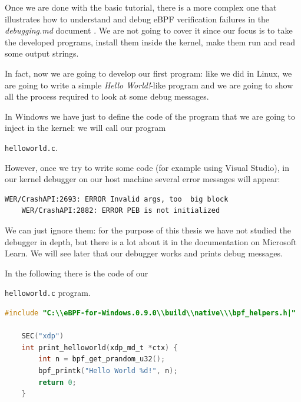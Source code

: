 Once we are done with the basic tutorial, there is a more complex one that illustrates how to understand and debug eBPF verification failures in the \textit{debugging.md} document \cite{DebugDoc}.
We are not going to cover it since our focus is to take the developed programs, install them inside the kernel, make them run and read some output strings.

In fact, now we are going to develop our first program: like we did in Linux, we are going to write a simple \textit{Hello World!}-like program and we are going to show all the process required to look at some debug messages.

In Windows we have just to define the code of the program that we are going to inject in the kernel: we will call our program \raggedright\colorbox{backcolour}{\lstinline[style=commandline, language=bash]|helloworld.c|}.

However, once we try to write some code (for example using Visual Studio), in our kernel debugger on our host machine several error messages will appear:

\begin{lstlisting}[style=commandline, language=bash, caption={Windows kernel debugger error messages.}]
	WER/CrashAPI:2693: ERROR Invalid args, too  big block
	WER/CrashAPI:2882: ERROR PEB is not initialized
\end{lstlisting}

We can just ignore them: for the purpose of this thesis we have not studied the debugger in depth, but there is a lot about it in the documentation on Microsoft Learn.
We will see later that our debugger works and prints debug messages.

In the following there is the code of our \raggedright\colorbox{backcolour}{\lstinline[style=commandline, language=bash]|helloworld.c|} program.

\begin{lstlisting}[style=cstyle, language=C, caption={Code of the ``Hello world!''-like kernel side program in ebpf-for-windows.}, title=helloworld.c]
	#include "C:\\eBPF-for-Windows.0.9.0\\build\\native\\\bpf_helpers.h|"
	
	SEC("xdp")
	int print_helloworld(xdp_md_t *ctx) {
		int n = bpf_get_prandom_u32();
		bpf_printk("Hello World %d!", n);
		return 0;
	}
\end{lstlisting}

